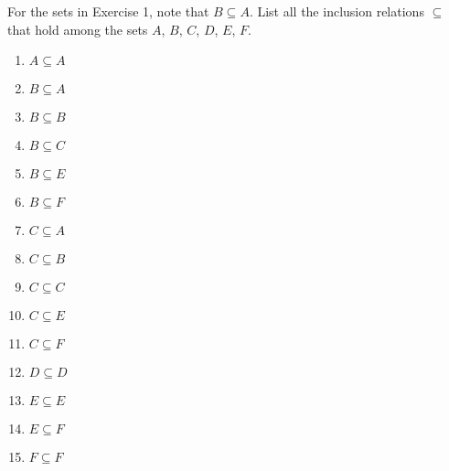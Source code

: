 \begin{question} For the sets in Exercise 1, note that $B \subseteq A$. List all the inclusion relations $\subseteq$ that hold among the sets $A$, $B$, $C$, $D$, $E$, $F$.
  \begin{enumerate}
    \item $A \subseteq A$
    \item $B \subseteq A$
    \item $B \subseteq B$
    \item $B \subseteq C$
    \item $B \subseteq E$
    \item $B \subseteq F$
    \item $C \subseteq A$
    \item $C \subseteq B$
    \item $C \subseteq C$
    \item $C \subseteq E$
    \item $C \subseteq F$
    \item $D \subseteq D$
    \item $E \subseteq E$
    \item $E \subseteq F$
    \item $F \subseteq F$
  \end{enumerate}
\end{question}


